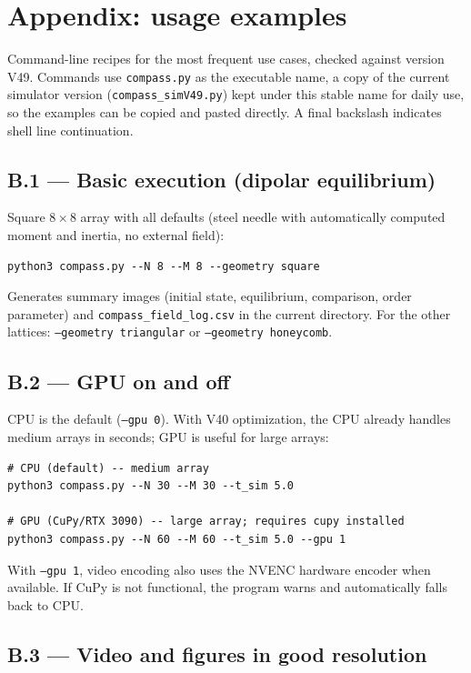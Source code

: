 \documentclass[11pt,a4paper]{article}
\newcommand{\code}[1]{\texttt{#1}}
\begin{document}
\section{Appendix: usage examples}
\label{app:exemplos}

Command-line recipes for the most frequent use cases, checked against version V49. Commands use \code{compass.py} as the executable name, a copy of the current simulator version (\code{compass\_simV49.py}) kept under this stable name for daily use, so the examples can be copied and pasted directly. A final backslash indicates shell line continuation.

\subsection*{B.1 --- Basic execution (dipolar equilibrium)}

Square $8\times8$ array with all defaults (steel needle with automatically computed moment and inertia, no external field):
\begin{verbatim}
python3 compass.py --N 8 --M 8 --geometry square
\end{verbatim}
Generates summary images (initial state, equilibrium, comparison, order parameter) and \code{compass\_field\_log.csv} in the current directory. For the other lattices: \code{--geometry triangular} or \code{--geometry honeycomb}.

\subsection*{B.2 --- GPU on and off}

CPU is the default (\code{--gpu 0}). With V40 optimization, the CPU already handles medium arrays in seconds; GPU is useful for large arrays:
\begin{verbatim}
# CPU (default) -- medium array
python3 compass.py --N 30 --M 30 --t_sim 5.0

# GPU (CuPy/RTX 3090) -- large array; requires cupy installed
python3 compass.py --N 60 --M 60 --t_sim 5.0 --gpu 1
\end{verbatim}
With \code{--gpu 1}, video encoding also uses the NVENC hardware encoder when available. If CuPy is not functional, the program warns and automatically falls back to CPU.

\subsection*{B.3 --- Video and figures in good resolution}
\end{document}
